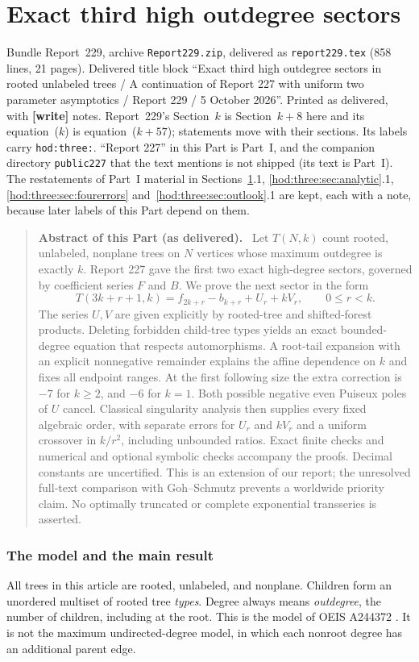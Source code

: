 \documentclass[11pt,letterpaper]{article}
\theoremstyle{definition}\newtheorem{definition}[theorem]{Definition}
\theoremstyle{remark}\newtheorem{remark}[theorem]{Remark}
\newcommand{\file}[1]{\nolinkurl{#1}}
\newenvironment{partabstract}{\begin{quote}\small\noindent\textbf{Abstract of this Part (as delivered).}\ }{\end{quote}}
\newcommand{\partsource}[1]{\par\noindent\begin{minipage}{\textwidth}\small #1\end{minipage}\par\medskip}
\begin{document}
\part{Exact third high outdegree sectors}\label{hod:three:part}
\partsource{Bundle Report~229, archive \file{Report229.zip}, delivered as \file{report229.tex} (858 lines, 21 pages). Delivered title block ``Exact third high outdegree sectors in rooted unlabeled trees / A continuation of Report 227 with uniform two parameter asymptotics / Report 229 / 5 October 2026''. Printed as delivered, with \textbf{[write]} notes. Report~229's Section~$k$ is Section~$k+8$ here and its equation~($k$) is equation~($k+57$); statements move with their sections. Its labels carry \file{hod:three:}. ``Report 227'' in this Part is Part~I, and the companion directory \file{public227} that the text mentions is not shipped (its text is Part~I). The restatements of Part~I material in Sections~\ref{hod:three:sec:model}.1, \ref{hod:three:sec:analytic}.1, \ref{hod:three:sec:fourerrors} and~\ref{hod:three:sec:outlook}.1 are kept, each with a note, because later labels of this Part depend on them.}
\begin{partabstract}
Let $T(N,k)$ count rooted, unlabeled, nonplane trees on $N$ vertices whose maximum outdegree is exactly $k$. Report 227 gave the first two exact high-degree sectors, governed by coefficient series $F$ and $B$. We prove the next sector in the form
\[
T(3k+r+1,k)=f_{2k+r}-b_{k+r}+U_r+kV_r,\qquad 0\le r<k.
\]
The series $U,V$ are given explicitly by rooted-tree and shifted-forest products. Deleting forbidden child-tree types yields an exact bounded-degree equation that respects automorphisms. A root-tail expansion with an explicit nonnegative remainder explains the affine dependence on $k$ and fixes all endpoint ranges. At the first following size the extra correction is $-7$ for $k\ge2$, and $-6$ for $k=1$. Both possible negative even Puiseux poles of $U$ cancel. Classical singularity analysis then supplies every fixed algebraic order, with separate errors for $U_r$ and $kV_r$ and a uniform crossover in $k/r^2$, including unbounded ratios. Exact finite checks and numerical and optional symbolic checks accompany the proofs. Decimal constants are uncertified. This is an extension of our report; the unresolved full-text comparison with Goh--Schmutz prevents a worldwide priority claim. No optimally truncated or complete exponential transseries is asserted.
\end{partabstract}


\section{The model and the main result}\label{hod:three:sec:model}
All trees in this article are rooted, unlabeled, and nonplane. Children form an unordered multiset of rooted tree \emph{types}. Degree always means \emph{outdegree}, the number of children, including at the root. This is the model of OEIS A244372 \cite{oeis372}. It is not the maximum undirected-degree model, in which each nonroot degree has an additional parent edge.
\end{document}
